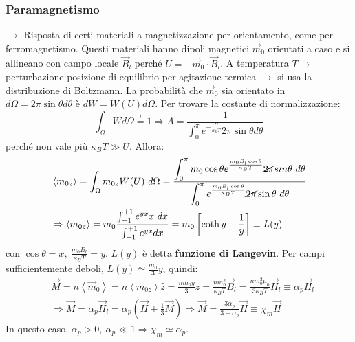 \documentclass[10pt, a4paper]{scrartcl}
\numberwithin{equation}{subsection}
\theoremstyle{style1}
\begin{document}
\subsubsection{Paramagnetismo}
$\to$ Risposta di certi materiali a magnetizzazione per orientamento, come per ferromagnetismo. Questi materiali hanno dipoli magnetici $\vec{m}_0$ orientati a caso e si allineano con campo locale $\vec{B}_l$ perch\'e $U = - \vec{m}_0 \cdot \vec{B}_l$. A temperatura $T\to$ perturbazione posizione di equilibrio per agitazione termica $\to$ si usa la distribuzione di Boltzmann. La probabilit\`a che $\vec{m}_0$ sia orientato in $d\Omega =2\pi \sin \theta  d\theta $ \`e $dW = W(U) d\Omega $. Per trovare la costante di normalizzazione:
\begin{equation}
	\int_{\Omega } W d\Omega \stackrel{!}{=}1 \Rightarrow A = \frac{1}{\int_{0} ^\pi e^{-\frac{U}{\kappa _B T}} 2\pi \sin \theta  d\theta }
\end{equation}
perch\'e non vale pi\`u $\kappa _B T \gg U$. Allora:
\begin{equation}
	\begin{split}
		&\left\langle m_{0z}  \right\rangle= \int_{\Omega } m_{0z} W(U) \ d\Omega = \frac{\displaystyle \int_{0} ^\pi m_0\cos \theta  e^{\frac{m_0B_l \cos \theta }{\kappa _B T}} \cancel{2\pi} sin \theta \ d\theta }{\displaystyle \int_{0} ^\pi e^{\frac{m_0B_l \cos\theta }{\kappa _B T}}\cancel{2\pi} \sin \theta  \ d\theta  }\\
		&\Rightarrow \left\langle m_{0z}  \right\rangle = m_0 \frac{\int_{-1} ^{+1} e^{yx} x \ dx}{\int_{-1} ^{+1} e^{yx} dx}= m_0 \left[ \operatorname{coth} y - \frac{1}{y}  \right] \equiv L(y)
	\end{split}
\end{equation}
con $\cos\theta =x, \ \frac{m_0 B_l}{\kappa _B T}= y$. $L(y)$ \`e detta \textbf{funzione di Langevin}. Per campi sufficientemente deboli, $L(y) \simeq \frac{m_0}{3}y$, quindi:
\begin{equation}
	\begin{split}
		&\vec{M} = n \left\langle \vec{m}_0 \right\rangle= n \left\langle m_{0z}  \right\rangle \hat{z}= \frac{n m_0y}{3} \hat{z}= \frac{nm_0^2}{\kappa _B T} \vec{B}_l	= \frac{nm_0^2\mu_0}{3\kappa _B T}\vec{H}_l \equiv \alpha _p \vec{H}_l\\
		&\Rightarrow \vec{M} = \alpha _p \vec{H}_l = \alpha _p \left(\vec{H}+\frac{1}{3}\vec{M}\right) \Rightarrow \vec{M} = \frac{3 \alpha _p}{3-\alpha _p}\vec{H}\equiv \chi _m \vec{H}
	\end{split}
\end{equation}
In questo caso, $\alpha _p >0, \ \alpha _p \ll 1 \Rightarrow \chi _m \simeq \alpha _p$.
\end{document}
